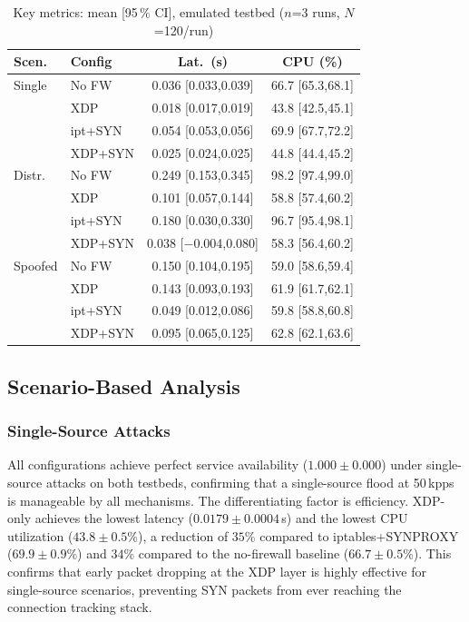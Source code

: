 \documentclass[conference]{IEEEtran}
\begin{document}
\begin{table}[h]
\centering
\caption{Key metrics: mean [95\,\% CI], emulated testbed
($n$=3 runs, $N$=120/run)}
\label{tab:ci_stats}
\footnotesize
\setlength{\tabcolsep}{2pt}
\begin{tabular}{|l|l|c|c|}
\hline
\textbf{Scen.} & \textbf{Config} &
\textbf{Lat.\ (s)} & \textbf{CPU (\%)} \\
\hline
Single & No FW   & 0.036 [0.033,0.039] & 66.7 [65.3,68.1] \\
       & XDP     & 0.018 [0.017,0.019] & 43.8 [42.5,45.1] \\
       & ipt+SYN & 0.054 [0.053,0.056] & 69.9 [67.7,72.2] \\
       & XDP+SYN & 0.025 [0.024,0.025] & 44.8 [44.4,45.2] \\
\hline
Distr. & No FW   & 0.249 [0.153,0.345] & 98.2 [97.4,99.0] \\
       & XDP     & 0.101 [0.057,0.144] & 58.8 [57.4,60.2] \\
       & ipt+SYN & 0.180 [0.030,0.330] & 96.7 [95.4,98.1] \\
       & XDP+SYN & 0.038 [$-$0.004,0.080] & 58.3 [56.4,60.2] \\
\hline
Spoofed & No FW   & 0.150 [0.104,0.195] & 59.0 [58.6,59.4] \\
        & XDP     & 0.143 [0.093,0.193] & 61.9 [61.7,62.1] \\
        & ipt+SYN & 0.049 [0.012,0.086] & 59.8 [58.8,60.8] \\
        & XDP+SYN & 0.095 [0.065,0.125] & 62.8 [62.1,63.6] \\
\hline
\end{tabular}
\end{table}

\subsection{Scenario-Based Analysis}

\subsubsection{Single-Source Attacks}

All configurations achieve perfect service availability
($1.000 \pm 0.000$) under single-source attacks on both testbeds,
confirming that a single-source flood at 50\,kpps is manageable by all
mechanisms.
The differentiating factor is efficiency.
XDP-only achieves the lowest latency ($0.0179 \pm 0.0004$\,s) and the
lowest CPU utilization ($43.8 \pm 0.5$\%), a reduction of $35$\% compared
to iptables+SYNPROXY ($69.9 \pm 0.9$\%) and $34$\% compared to the
no-firewall baseline ($66.7 \pm 0.5$\%).
This confirms that early packet dropping at the XDP layer is highly
effective for single-source scenarios, preventing SYN packets from ever
reaching the connection tracking stack.
\end{document}
